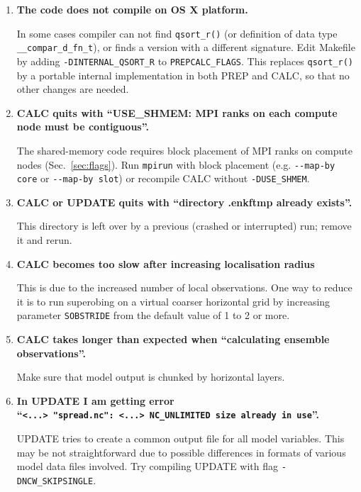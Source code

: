 \documentclass[11pt]{report}
\begin{document}
\begin{enumerate}

\item{\bf The code does not compile on OS X platform.}

In some cases compiler can not find \verb|qsort_r()| (or definition of data type \verb|__compar_d_fn_t|), or finds a version with a different signature.
Edit Makefile by adding \verb|-DINTERNAL_QSORT_R| to \verb|PREPCALC_FLAGS|.
This replaces \verb|qsort_r()| by a portable internal implementation in both PREP and CALC, so that no other changes are needed.

\item{\bf CALC quits with ``USE\_SHMEM: MPI ranks on each compute node must be contiguous''.}

The shared-memory code requires block placement of MPI ranks on compute nodes (Sec.~\ref{sec:flags}).
Run \verb|mpirun| with block placement (e.g. \verb|--map-by core| or \verb|--map-by slot|) or recompile CALC without \verb|-DUSE_SHMEM|.

\item{\bf CALC or UPDATE quits with ``directory .enkftmp already exists''.}

This directory is left over by a previous (crashed or interrupted) run; remove it and rerun.

\item{\bf CALC becomes too slow after increasing localisation radius}

This is due to the increased number of local observations.
One way to reduce it is to run superobing on a virtual coarser horizontal grid by increasing parameter \verb|SOBSTRIDE| from the default value of 1 to 2 or more.

\item{\bf CALC takes longer than expected when ``calculating ensemble observations''.}

Make sure that model output is chunked by horizontal layers.

\item{\bf In UPDATE I am getting error \\``\verb|<...> "spread.nc": <...> NC_UNLIMITED size already in use|''.}

UPDATE tries to create a common output file for all model variables.
This may be not straightforward due to possible differences in formats of various model data files involved.
Try compiling UPDATE with flag \verb|-DNCW_SKIPSINGLE|.

\end{enumerate}
\end{document}
